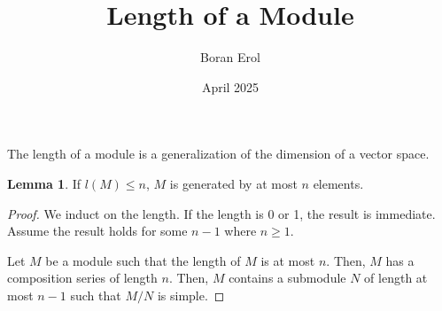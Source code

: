 \documentclass{article}
\title{Length of a Module}
\date{April 2025}
\author{Boran Erol}
\theoremstyle{definition}
\newtheorem{lemma}[theorem]{Lemma}
\begin{document}
\maketitle


The length of a module is a generalization of the dimension of a vector space.


\begin{lemma}
    If $ l(M) \leq n $, $ M $ is generated by at most $ n $ elements.
\end{lemma}
\begin{proof}
    We induct on the length. If the length is 0 or 1,
    the result is immediate. Assume the result holds for some
    $ n - 1 $ where $ n \geq 1 $.

    Let $ M $ be a module such that the length of $ M $ is at most $ n $.
    Then, $ M $ has a composition series of length $ n $.
    Then, $ M $ contains a submodule $ N $ of length at most $ n - 1 $
    such that $ M/N $ is simple.

\end{proof}
\end{document}
